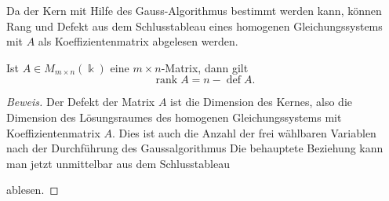 Da der Kern mit Hilfe des Gauss-Algorithmus bestimmt werden kann,
können Rang und Defekt aus dem Schlusstableau
eines homogenen Gleichungssystems mit $A$ als Koeffizientenmatrix
abgelesen werden.

\begin{satz}
Ist $A\in M_{m\times n}(\Bbbk)$ eine $m\times n$-Matrix,
dann gilt
\[
\operatorname{rank}A
=
n-\operatorname{def}A.
\]
\end{satz}

\begin{proof}[Beweis]
Der Defekt der Matrix $A$ ist die Dimension des Kernes, also die
Dimension des Lösungsraumes des homogenen Gleichungssystems mit
Koeffizientenmatrix $A$.
Dies ist auch die Anzahl der frei wählbaren Variablen nach
der Durchführung des Gaussalgorithmus
Die behauptete Beziehung kann man jetzt unmittelbar aus dem
Schlusstableau
\begin{center}
\end{center}
ablesen.
\end{proof}

